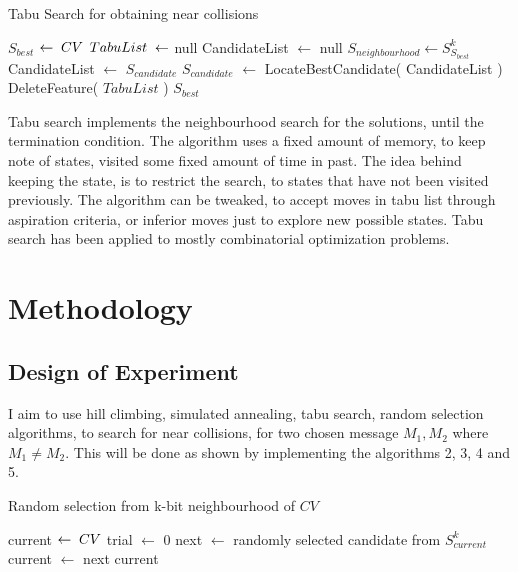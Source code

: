 \documentclass[12pt]{artikel3}                  %
\begin{document}
\begin{algorithm}[h]
  \caption{ Tabu Search for obtaining near collisions \cite{00036}}
  \begin{algorithmic}[1]
      \State $S_{best}$ $\gets \thickspace CV$
      \State $TabuList \thickspace \gets$ null
        \State CandidateList $\gets$ null
        \State $S_{neighbourhood} \gets S^{k}_{S_{best}}$
            \State CandidateList $\gets$ $S_{candidate}$
          \EndIf
        \EndFor
        \State $S_{candidate}$ $\gets$ LocateBestCandidate( CandidateList )
            \State DeleteFeature( $TabuList$ )
          \EndWhile
        \EndIf
      \EndWhile 
      \State \Return $S_{best}$
    \EndFunction
  \end{algorithmic}
\end{algorithm}

Tabu search implements the neighbourhood search for the solutions, until the termination condition. The algorithm
uses a fixed amount of memory, to keep note of states, visited some fixed amount of time in past. The idea behind
keeping the state, is to restrict the search, to states that have not been visited previously. The algorithm can be
tweaked, to accept moves in tabu list through aspiration criteria, or inferior moves just to explore new possible
states. Tabu search has been applied to mostly combinatorial optimization problems\cite{ 00034, 00035 }.

\section{Methodology}

\subsection{Design of Experiment}
I aim to use hill climbing, simulated annealing, tabu search, random selection algorithms, to search for near 
collisions, for two chosen message $M_{1},M_{2}$ where $M_{1} \neq M_{2}$. This will be done as shown by implementing
the algorithms 2, 3, 4 and 5.

\begin{algorithm}[h]
  \caption{ Random selection from k-bit neighbourhood of $CV$ }
  \begin{algorithmic}[1]
      \State current $\gets \thickspace CV$
      \State trial $\gets$ 0
        \State next $\gets$ randomly selected candidate from $S^{k}_{current}$
          \State current $\gets$ next
        \EndIf
      \EndWhile 
      \State \Return current
    \EndFunction
  \end{algorithmic}
\end{algorithm}
\end{document}
